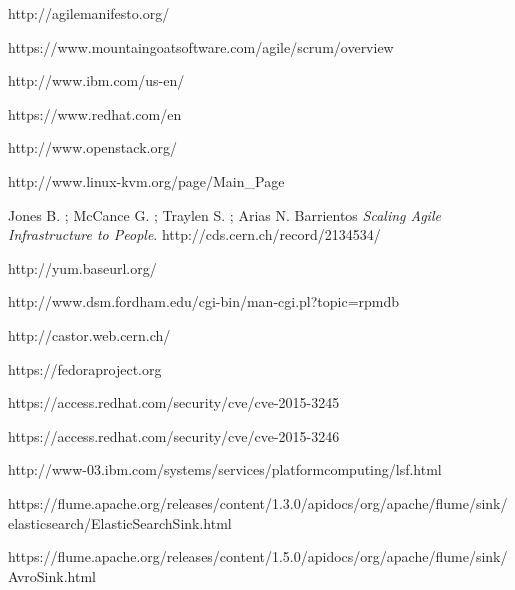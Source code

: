 
\begin{thebibliography}{90}
\rhead[\fancyplain{}{\bfseries \leftmark}]{\fancyplain{}{\bfseries
\thepage}}

http://agilemanifesto.org/

https://www.mountaingoatsoftware.com/agile/scrum/overview

http://www.ibm.com/us-en/

https://www.redhat.com/en

http://www.openstack.org/

http://www.linux-kvm.org/page/Main\_Page

Jones B. ; McCance G. ; Traylen S. ; Arias N. Barrientos 
\textit{Scaling Agile Infrastructure to People}.
http://cds.cern.ch/record/2134534/

http://yum.baseurl.org/

http://www.dsm.fordham.edu/cgi-bin/man-cgi.pl?topic=rpmdb

http://castor.web.cern.ch/

https://fedoraproject.org

https://access.redhat.com/security/cve/cve-2015-3245

https://access.redhat.com/security/cve/cve-2015-3246

http://www-03.ibm.com/systems/services/platformcomputing/lsf.html

https://flume.apache.org/releases/content/1.3.0/apidocs/org/apache/flume/sink/elasticsearch/ElasticSearchSink.html

https://flume.apache.org/releases/content/1.5.0/apidocs/org/apache/flume/sink/AvroSink.html




\end{thebibliography}
